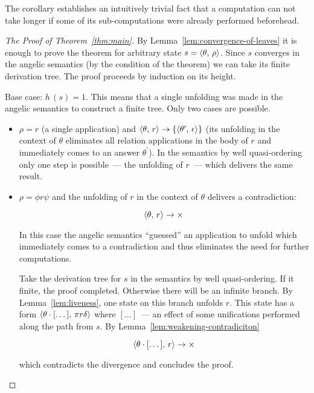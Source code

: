 The corollary establishes an intuitively trivial fact that a computation can not take longer if some of its sub-computations were
already performed beforehead.

\begin{proof}[The Proof of Theorem~\ref{thm:main}]
  By Lemma~\ref{lem:convergence-of-leaves} it is enough to prove the theorem for arbitrary state $s=\langle \theta,\,\rho \rangle$. Since $s$
  converges in the angelic semantics (by the condition of the theorem) we can take its finite derivation tree. The proof proceeds by induction
  on its height.

  Base case: $h\,(s)=1$. This means that a single unfolding was made in the angelic semantics to construct a finite tree. Only two cases
  are possible.

  \begin{itemize}
  \item $\rho=r$ (a single application) and $\langle \theta,\,r \rangle\to\{\langle \theta^\prime,\,\epsilon \rangle\}$ (its unfolding in the context of $\theta$
    eliminates all relation applications in the body of $r$ and immediately comes to an answer $\theta^\prime$). In the semantics by well quasi-ordering
    only one step is possible~--- the unfolding of $r$~--- which delivers the same result.
    
  \item $\rho=\phi r \psi$ and the unfolding of $r$ in the context of $\theta$ delivers a contradiction:

    \[
    \langle \theta,\,r \rangle\to\times
    \]

    In this case the angelic semantics ``guessed'' an application to unfold which immediately comes to a contradiction and thus eliminates the
    need for further computations.

    Take the derivation tree for $s$ in the semantics by well quasi-ordering. If it finite, the proof completed. Otherwise there will be an infinite branch. By
    Lemma~\ref{lem:liveness}, one state on this branch unfolds $r$. This state has a form $\langle \theta\cdot[\dots],\,\pi r \delta \rangle$ where
    $[\dots]$~--- an effect of some unifications performed along the path from $s$. By Lemma~\ref{lem:weakening-contradiciton}
    
    \[
    \langle \theta\cdot[\dots],\,r \rangle\to\times
    \]

    which contradicts the divergence and concludes the proof.
    
  \end{itemize}


\end{proof}
